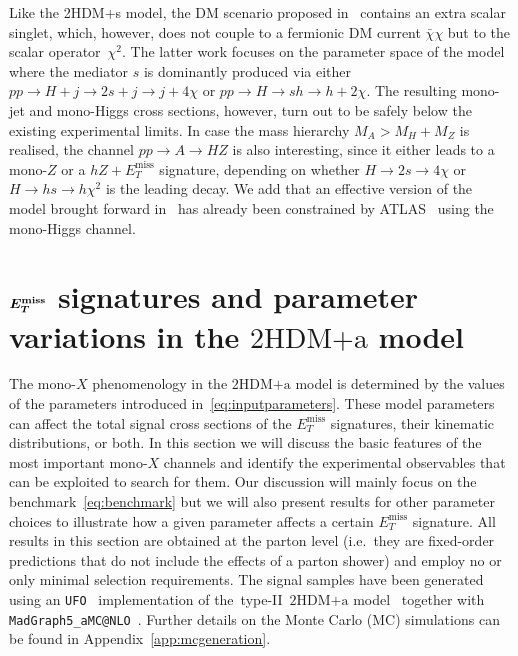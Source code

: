 \documentclass[a4paper, 11pt,notoc]{article}
\newcommand{\MET}{\ensuremath{E_T^\mathrm{miss}}\xspace}
\newcommand{\hdma}{\ensuremath{\textrm{2HDM+a}}\xspace}
\def\bm#1{\mbox{\boldmath$#1$\unboldmath}}
\begin{document}
 Like the 2HDM+s model, the DM scenario proposed in~\cite{vonBuddenbrock:2016rmr} contains an extra scalar singlet, which, however, does not couple to a fermionic DM current $\bar \chi \chi$ but to the scalar operator~$\chi^2$. The latter work focuses on the parameter space of the model where the mediator $s$ is dominantly produced via either  $pp \to H + j \to 2s + j \to j + 4 \chi$ or $pp \to H \to sh \to h + 2\chi$. The resulting mono-jet and mono-Higgs cross sections, however, turn out to be safely below the existing experimental limits. In case the mass hierarchy  $M_A > M_H + M_Z$ is realised, the channel $pp \to A \to HZ$ is also interesting, since it either leads to a mono-$Z$ or a $hZ+\MET$ signature, depending on whether $H \to 2 s \to 4 \chi$ or $H \to h s \to h \chi^2$ is the leading decay. We add that an effective version of the model brought forward in~\cite{vonBuddenbrock:2016rmr}  has already been constrained by ATLAS~\cite{Aaboud:2017uak} using the mono-Higgs channel.  


\section{$\bm{E_T^{\rm miss}}$ signatures and parameter variations in the \hdma model}
\label{sec:experimentbasics}

The mono-$X$ phenomenology in the  \hdma model is determined by the values of the parameters introduced in~\eqref{eq:inputparameters}. These model parameters can affect the total signal cross sections of the $\MET$ signatures, their kinematic distributions, or both. In this section we will discuss the basic features of the most important mono-$X$ channels and identify the experimental observables that can be exploited to search for them. Our discussion will  mainly focus on the benchmark~\eqref{eq:benchmark} but we will also present results for other parameter choices to illustrate how a given parameter affects a certain $\MET$ signature.  All results in this section are obtained at the parton level (i.e.~they are fixed-order predictions that do not include the effects of a parton shower) and employ no or only minimal selection requirements. The signal samples have been generated using an {\tt UFO}~\cite{Degrande:2011ua} implementation of the~type-II~\hdma model~\cite{hdmaUFO} together with {\tt MadGraph5\_aMC@NLO}~\cite{Alwall:2014hca}. Further details on the Monte Carlo (MC) simulations can be found in Appendix~\ref{app:mcgeneration}.
\end{document}
